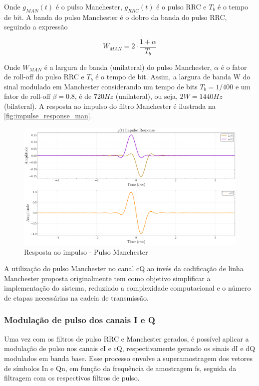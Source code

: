 Onde $g_{MAN}(t)$ é o pulso Manchester, $g_{RRC}(t)$ é o pulso RRC e $T_b$ é o tempo de bit. A banda do pulso \gls{Manchester} é o dobro da banda do pulso \gls{RRC}, seguindo a expressão 

\begin{equation}
W_{MAN} = 2 \cdot \frac{1 + \alpha}{T_b}
\end{equation}

\noindent Onde $W_{MAN}$ é a largura de banda (unilateral) do pulso \gls{Manchester}, $\alpha$ é o fator de roll-off do pulso \gls{RRC} e $T_b$ é o tempo de bit. Assim, a largura de banda \gls{W} do sinal modulado em \gls{Manchester} considerando um tempo de bits $T_b = 1/400$ e um fator de roll-off $\beta = 0.8$, é de $720 Hz$ (unilateral), ou seja, $2W = 1440 Hz$ (bilateral). A resposta ao impulso do filtro \gls{Manchester} é ilustrada na \autoref{fig:impulse_response_man}.

\begin{figure}[H]
	\centering
	\caption{Resposta ao impulso - Pulso Manchester}\label{fig:impulse_response_man}
	\includegraphics[width=\linewidth]{assets/cap3/example_formatter_impulse_man.pdf}
\end{figure}

A utilização do pulso \gls{Manchester} no canal \gls{cQ} ao invés da codificação de linha \gls{Manchester} proposta originalmente tem como objetivo simplificar a implementação do sistema, reduzindo a complexidade computacional e o número de etapas necessárias na cadeia de transmissão. 

\subsubsection{Modulação de pulso dos canais I e Q}

Uma vez com os filtros de pulso \gls{RRC} e \gls{Manchester} gerados, é possível aplicar a modulação de pulso nos canais \gls{cI} e \gls{cQ}, respectivamente gerando os sinais \gls{dI} e \gls{dQ} modulados em banda base. Esse processo envolve a superamostragem dos vetores de símbolos \gls{In} e \gls{Qn}, em função da frequência de amostragem \gls{fs}, seguida da filtragem com os respectivos filtros de pulso. 

